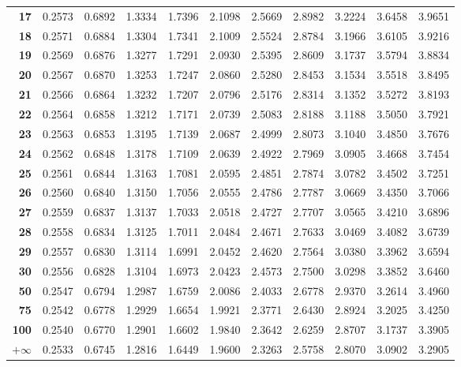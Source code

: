 \begin{table}[ht]
\begin{tabular}{rrrrrrrrrrr}
  \textbf{17} & 0.2573 & 0.6892 & 1.3334 & 1.7396 & 2.1098 & 2.5669 & 2.8982 & 3.2224 & 3.6458 & 3.9651 \\
  \textbf{18} & 0.2571 & 0.6884 & 1.3304 & 1.7341 & 2.1009 & 2.5524 & 2.8784 & 3.1966 & 3.6105 & 3.9216 \\
  \textbf{19} & 0.2569 & 0.6876 & 1.3277 & 1.7291 & 2.0930 & 2.5395 & 2.8609 & 3.1737 & 3.5794 & 3.8834 \\
  \textbf{20} & 0.2567 & 0.6870 & 1.3253 & 1.7247 & 2.0860 & 2.5280 & 2.8453 & 3.1534 & 3.5518 & 3.8495 \\
  \textbf{21} & 0.2566 & 0.6864 & 1.3232 & 1.7207 & 2.0796 & 2.5176 & 2.8314 & 3.1352 & 3.5272 & 3.8193 \\
  \textbf{22} & 0.2564 & 0.6858 & 1.3212 & 1.7171 & 2.0739 & 2.5083 & 2.8188 & 3.1188 & 3.5050 & 3.7921 \\
  \textbf{23} & 0.2563 & 0.6853 & 1.3195 & 1.7139 & 2.0687 & 2.4999 & 2.8073 & 3.1040 & 3.4850 & 3.7676 \\
  \textbf{24} & 0.2562 & 0.6848 & 1.3178 & 1.7109 & 2.0639 & 2.4922 & 2.7969 & 3.0905 & 3.4668 & 3.7454 \\
  \textbf{25} & 0.2561 & 0.6844 & 1.3163 & 1.7081 & 2.0595 & 2.4851 & 2.7874 & 3.0782 & 3.4502 & 3.7251 \\
  \textbf{26} & 0.2560 & 0.6840 & 1.3150 & 1.7056 & 2.0555 & 2.4786 & 2.7787 & 3.0669 & 3.4350 & 3.7066 \\
  \textbf{27} & 0.2559 & 0.6837 & 1.3137 & 1.7033 & 2.0518 & 2.4727 & 2.7707 & 3.0565 & 3.4210 & 3.6896 \\
  \textbf{28} & 0.2558 & 0.6834 & 1.3125 & 1.7011 & 2.0484 & 2.4671 & 2.7633 & 3.0469 & 3.4082 & 3.6739 \\
  \textbf{29} & 0.2557 & 0.6830 & 1.3114 & 1.6991 & 2.0452 & 2.4620 & 2.7564 & 3.0380 & 3.3962 & 3.6594 \\
  \textbf{30} & 0.2556 & 0.6828 & 1.3104 & 1.6973 & 2.0423 & 2.4573 & 2.7500 & 3.0298 & 3.3852 & 3.6460 \\
  \textbf{50} & 0.2547 & 0.6794 & 1.2987 & 1.6759 & 2.0086 & 2.4033 & 2.6778 & 2.9370 & 3.2614 & 3.4960 \\
  \textbf{75} & 0.2542 & 0.6778 & 1.2929 & 1.6654 & 1.9921 & 2.3771 & 2.6430 & 2.8924 & 3.2025 & 3.4250 \\
  \textbf{100} & 0.2540 & 0.6770 & 1.2901 & 1.6602 & 1.9840 & 2.3642 & 2.6259 & 2.8707 & 3.1737 & 3.3905 \\
  \textbf{$+\infty$} & 0.2533 & 0.6745 & 1.2816 & 1.6449 & 1.9600 & 2.3263 & 2.5758 & 2.8070 & 3.0902 & 3.2905 \\
   \hline
\end{tabular}
\end{table}






